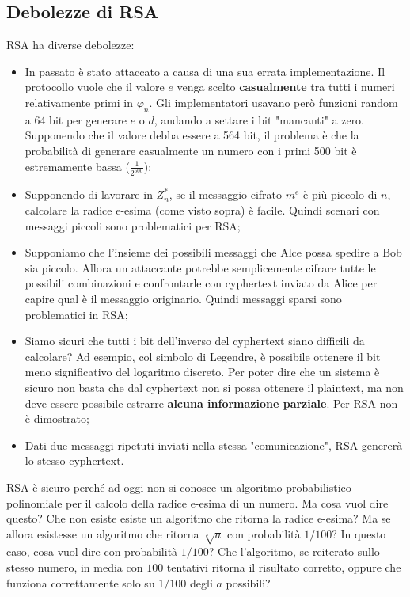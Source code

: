 \subsection{Debolezze di RSA}
RSA ha diverse debolezze:
\begin{itemize}
    \item In passato è stato attaccato a causa di una sua errata implementazione. Il protocollo vuole che il valore $e$ venga scelto \textbf{casualmente} tra tutti i numeri relativamente primi in $\varphi_n$. Gli implementatori usavano però funzioni random a 64 bit per generare $e$ o $d$, andando a settare i bit "mancanti" a zero. Supponendo che il valore debba essere a 564 bit, il problema è che la probabilità di generare casualmente un numero con i primi 500 bit è estremamente bassa ($\frac{1}{2^{500}}$);
    \item Supponendo di lavorare in $Z_n^*$, se il messaggio cifrato $m^e$ è più piccolo di $n$, calcolare la radice e-esima (come visto sopra) è facile. Quindi scenari con messaggi piccoli sono problematici per RSA;
    \item Supponiamo che l'insieme dei possibili messaggi che Alce possa spedire a Bob sia piccolo. Allora un attaccante potrebbe semplicemente cifrare tutte le possibili combinazioni e confrontarle con cyphertext inviato da Alice per capire qual è il messaggio originario. Quindi messaggi sparsi sono problematici in RSA;
    \item Siamo sicuri che tutti i bit dell'inverso del cyphertext siano difficili da calcolare? Ad esempio, col simbolo di Legendre, è possibile ottenere il bit meno significativo del logaritmo discreto. Per poter dire che un sistema è sicuro non basta che dal cyphertext non si possa ottenere il plaintext, ma non deve essere possibile estrarre \textbf{alcuna informazione parziale}. Per RSA non è dimostrato;
    \item Dati due messaggi ripetuti inviati nella stessa "comunicazione", RSA genererà lo stesso cyphertext. 
\end{itemize}

\noindent RSA è sicuro perché ad oggi non si conosce un algoritmo probabilistico polinomiale per il calcolo della radice e-esima di un numero. Ma cosa vuol dire questo? Che non esiste esiste un algoritmo che ritorna la radice e-esima? Ma se allora esistesse un algoritmo che ritorna $\sqrt[e]{a}$ con probabilità $1 / 100$? In questo caso, cosa vuol dire con probabilità $1 / 100$? Che l'algoritmo, se reiterato sullo stesso numero, in media con $100$ tentativi ritorna il risultato corretto, oppure che funziona correttamente solo su $1 / 100$ degli $a$ possibili? 


